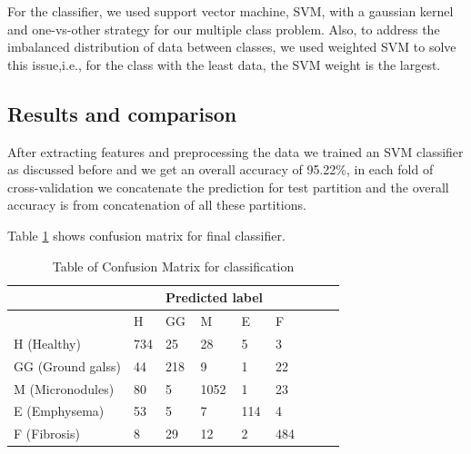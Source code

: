 \documentclass[conference]{IEEEtran}
\begin{document}
For the classifier, we used support vector machine, SVM, with a gaussian kernel and one-vs-other strategy for our multiple class problem. Also, to address the imbalanced distribution of data between classes, we used weighted SVM to solve this issue,i.e., for the class with the least data, the SVM weight is the largest.





\subsection{\textbf{Results and comparison}}

After extracting features and preprocessing the data we trained an SVM classifier as discussed before and we get an overall accuracy of 95.22\%, in each fold of cross-validation we concatenate the prediction for test partition and the overall accuracy is from concatenation of all these partitions.


Table  \ref{cm:CM} shows confusion matrix for final classifier.



\begin{table}[tbh]
\caption{Table of Confusion Matrix for classification}
\label{cm:CM}
\small
\centering
\begin{tabular}{@{}lllllllll@{}}
&& \multicolumn{3}{c}{Predicted label}\\
\toprule
 & H & GG & M & E & F \\ \midrule
 
H (Healthy) & 734 & 25 & 28 & 5 & 3 \\ 
GG (Ground galss) & 44 & 218 & 9 & 1 & 22 \\ 
M (Micronodules) & 80 & 5 & 1052 & 1 & 23 \\ 
E (Emphysema) & 53 & 5 & 7 & 114 & 4 \\ 
F (Fibrosis) & 8 & 29 & 12 & 2 & 484 \\ \bottomrule

\end{tabular}
\end{table}
\end{document}
